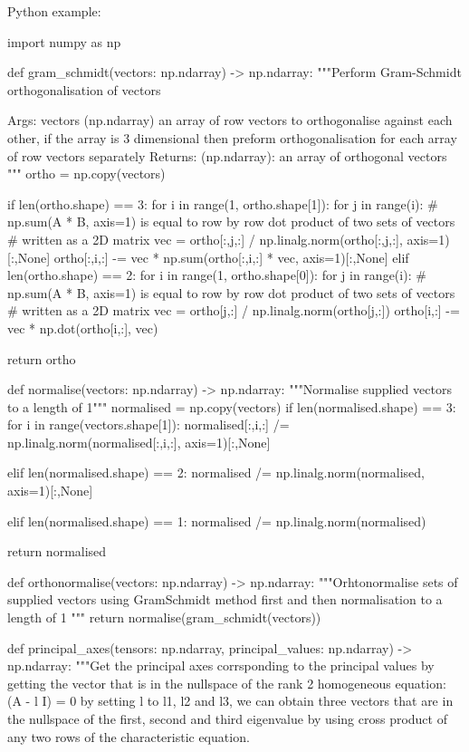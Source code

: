 \begin{itemize}
        Python example:

        \begin{python}
import numpy as np

def gram_schmidt(vectors: np.ndarray) -> np.ndarray:
    """Perform Gram-Schmidt orthogonalisation of vectors

    Args:
        vectors (np.ndarray) an array of row vectors to orthogonalise against
                             each other, if the array is 3 dimensional then
                             preform orthogonalisation for each array of
                             row vectors separately
    Returns:
        (np.ndarray): an array of orthogonal vectors
    """
    ortho = np.copy(vectors)

    if len(ortho.shape) == 3:
        for i in range(1, ortho.shape[1]):
            for j in range(i):
                # np.sum(A * B, axis=1) is equal to row by row dot product of two sets of vectors
                # written as a 2D matrix
                vec = ortho[:,j,:] / np.linalg.norm(ortho[:,j,:], axis=1)[:,None]
                ortho[:,i,:] -= vec * np.sum(ortho[:,i,:] * vec, axis=1)[:,None]
    elif len(ortho.shape) == 2:
        for i in range(1, ortho.shape[0]):
            for j in range(i):
                # np.sum(A * B, axis=1) is equal to row by row dot product of two sets of vectors
                # written as a 2D matrix
                vec = ortho[j,:] / np.linalg.norm(ortho[j,:])
                ortho[i,:] -= vec * np.dot(ortho[i,:], vec)

    return ortho


def normalise(vectors: np.ndarray) -> np.ndarray:
    """Normalise supplied vectors to a length of 1"""
    normalised = np.copy(vectors)
    if len(normalised.shape) == 3:
        for i in range(vectors.shape[1]):
            normalised[:,i,:] /= np.linalg.norm(normalised[:,i,:], axis=1)[:,None]

    elif len(normalised.shape) == 2:
        normalised /= np.linalg.norm(normalised, axis=1)[:,None]

    elif len(normalised.shape) == 1:
        normalised /= np.linalg.norm(normalised)

    return normalised


def orthonormalise(vectors: np.ndarray) -> np.ndarray:
    """Orhtonormalise sets of supplied vectors using GramSchmidt method
    first and then normalisation to a length of 1
    """
    return normalise(gram_schmidt(vectors))


def principal_axes(tensors: np.ndarray, principal_values: np.ndarray) -> np.ndarray:
    """Get the principal axes corrsponding to the principal values by
    getting the vector that is in the nullspace of the rank 2 homogeneous
    equation:
         (A  - l I) = 0
    by setting l to l1, l2 and l3, we can obtain three vectors that are
    in the nullspace of the first, second and third eigenvalue by using
    cross product of any two rows of the characteristic equation.


\end{python}
\end{itemize}
